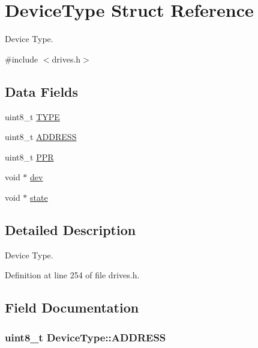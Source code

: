 \hypertarget{structDeviceType}{}\section{Device\+Type Struct Reference}
\label{structDeviceType}


Device Type.  




{\ttfamily \#include $<$drives.\+h$>$}

\subsection*{Data Fields}
\begin{DoxyCompactItemize}
\item 
uint8\+\_\+t \hyperlink{structDeviceType_acee5219162b6f47a9423b2086d127ede}{T\+Y\+PE}
\item 
uint8\+\_\+t \hyperlink{structDeviceType_a62529b7435785e39e8e7c5019303c2dd}{A\+D\+D\+R\+E\+SS}
\item 
uint8\+\_\+t \hyperlink{structDeviceType_ae0e59c6c17582ff80bdab3f2010e8d57}{P\+PR}
\item 
void $\ast$ \hyperlink{structDeviceType_a59fc3b3cb45f8ee0cd1016bd64804d3b}{dev}
\item 
void $\ast$ \hyperlink{structDeviceType_ad0fc43d63606bab6c259047e36512e08}{state}
\end{DoxyCompactItemize}


\subsection{Detailed Description}
Device Type. 

Definition at line 254 of file drives.\+h.



\subsection{Field Documentation}
\subsubsection[{\texorpdfstring{A\+D\+D\+R\+E\+SS}{ADDRESS}}]{\setlength{\rightskip}{0pt plus 5cm}uint8\+\_\+t Device\+Type\+::\+A\+D\+D\+R\+E\+SS}\hypertarget{structDeviceType_a62529b7435785e39e8e7c5019303c2dd}{}\label{structDeviceType_a62529b7435785e39e8e7c5019303c2dd}


